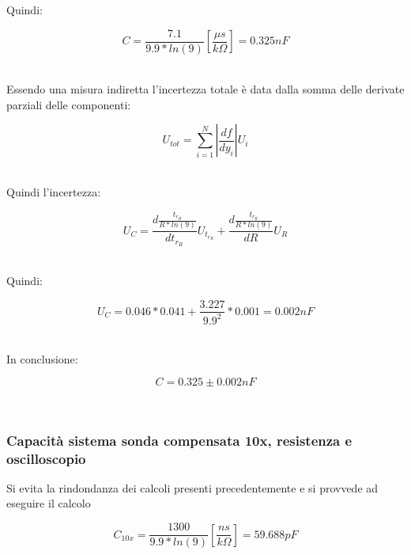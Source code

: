 \documentclass[a4paper]{article}
\begin{document}
Quindi:
\begin{Large}
	\begin{equation}
  		C= \frac{7.1}{9.9*ln(9)} [\frac{\mu s}{k\Omega}]= 0.325nF
	\end{equation}
\end{Large}\\

Essendo una misura indiretta l'incertezza totale è data dalla somma delle derivate parziali delle componenti:
\begin{Large}
	\begin{equation}
		U_{tot}=\sum_{i=1}^{N}|{\frac{df}{dy_i}}| U_i
	\end{equation}
\end{Large}\\

Quindi l'incertezza:
\begin{Large}
	\begin{equation}
		{U_C}= \frac{d\frac{t_{r_R}}{R*ln(9)}}{dt_{r_R}}U_{t_{r_R}}+\frac{d\frac{t_{r_R}}{R*ln(9)}}{dR}U_{R}
	\end{equation}
\end{Large}\\

Quindi:
\begin{Large}
	\begin{equation}
		{U_C}= 0.046*0.041+\frac{3.227}{9.9^2}*0.001=0.002 nF
	\end{equation}
\end{Large}\\

In conclusione: 
\begin{Large}
	\begin{equation}
		C=0.325\pm 0.002nF
	\end{equation}
\end{Large}\\

\subsubsection{Capacità sistema sonda compensata 10x, resistenza e oscilloscopio }
Si evita la rindondanza dei calcoli presenti precedentemente e si provvede ad eseguire il calcolo
\begin{Large}
	\begin{equation}
  		C_{10x}= \frac{1300}{9.9*ln(9)} [\frac{ns}{k\Omega}]= 59.688pF
	\end{equation}
\end{Large}\\
\end{document}

